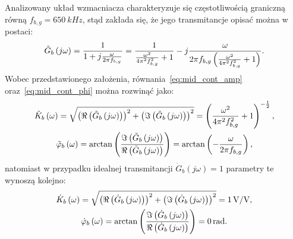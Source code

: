 Analizowany układ wzmacniacza charakteryzuje się częstotliwością graniczną równą $f_{b,g} = \qty{650}{kHz}$, stąd zakłada się, że jego transmitancje opisać można w postaci:
\begin{equation}
\tilde{G}_{b} \left(j\omega\right) = \frac{1}{1 + j \frac{\omega}{2 \pi f_{b,g}}} = \frac{1}{\frac{\omega^{2}}{4 \pi^{2} f_{b,g}^{2}} + 1} - j \frac{\omega}{2 \pi f_{b,g} \left( \frac{\omega^{2}}{4 \pi^{2} f_{b,g}^{2}} + 1 \right) } \label{eq:sym_partb_trans}.
\end{equation}
Wobec przedstawionego założenia, równania~\eqref{eq:mid_cont_amp} oraz~\eqref{eq:mid_cont_phi} można rozwinąć jako:
\begin{gather}
\tilde{K}_{b} \left(\omega\right) = \sqrt{\left( \Re \left( \tilde{G}_{b} \left(j\omega\right) \right) \right)^{2} + \left( \Im \left( \tilde{G}_{b} \left(j\omega\right) \right) \right)^{2}} = \left( \frac{\omega^{2}}{4 \pi^{2} f_{b,g}^{2}} + 1 \right)^{-\frac{1}{2}} \label{eq:sym_partb_amp_real}, \\
\tilde{\varphi}_{b} \left(\omega\right) = \arctan \left( \frac{\Im \left( \tilde{G}_{b} \left(j\omega\right) \right)}{\Re \left( \tilde{G}_{b} \left(j\omega\right) \right)} \right) = \arctan \left( -\frac{\omega}{2 \pi f_{b,g}} \right) \label{eq:sym_partb_phi_real},
\end{gather}
natomiast w przypadku idealnej transmitancji $\dot{G}_{b}(j\omega) = 1$ parametry te wynoszą kolejno:
\begin{gather}
\dot{K}_{b} \left(\omega\right) = \sqrt{\left( \Re \left( \dot{G}_{b} \left(j\omega\right) \right) \right)^{2} + \left( \Im \left( \dot{G}_{b} \left(j\omega\right) \right) \right)^{2}} = \qty{1}{V \per V} \label{eq:sym_partb_amp_ideal}, \\
\dot{\varphi}_{b} \left(\omega\right) = \arctan \left( \frac{\Im \left( \dot{G}_{b} \left(j\omega\right) \right)}{\Re \left( \dot{G}_{b} \left(j\omega\right) \right)} \right) = \qty{0}{rad} \label{eq:sym_partb_phi_ideal}.
\end{gather}


